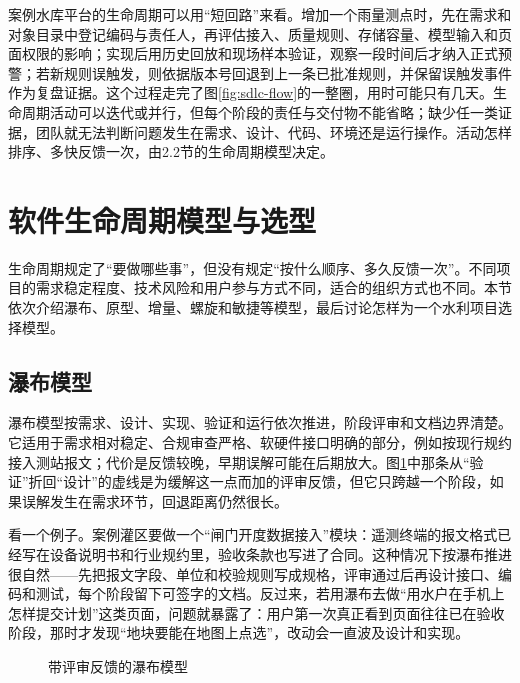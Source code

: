案例水库平台的生命周期可以用“短回路”来看。增加一个雨量测点时，先在需求和对象目录中登记编码与责任人，再评估接入、质量规则、存储容量、模型输入和页面权限的影响；实现后用历史回放和现场样本验证，观察一段时间后才纳入正式预警；若新规则误触发，则依据版本号回退到上一条已批准规则，并保留误触发事件作为复盘证据。这个过程走完了图\ref{fig:sdlc-flow}的一整圈，用时可能只有几天。生命周期活动可以迭代或并行，但每个阶段的责任与交付物不能省略；缺少任一类证据，团队就无法判断问题发生在需求、设计、代码、环境还是运行操作。活动怎样排序、多快反馈一次，由2.2节的生命周期模型决定。

\section{软件生命周期模型与选型}

生命周期规定了“要做哪些事”，但没有规定“按什么顺序、多久反馈一次”。不同项目的需求稳定程度、技术风险和用户参与方式不同，适合的组织方式也不同。本节依次介绍瀑布、原型、增量、螺旋和敏捷等模型，最后讨论怎样为一个水利项目选择模型。

\subsection{瀑布模型}

瀑布模型按需求、设计、实现、验证和运行依次推进，阶段评审和文档边界清楚。它适用于需求相对稳定、合规审查严格、软硬件接口明确的部分，例如按现行规约接入测站报文；代价是反馈较晚，早期误解可能在后期放大。图\ref{fig:waterfall-model}中那条从“验证”折回“设计”的虚线是为缓解这一点而加的评审反馈，但它只跨越一个阶段，如果误解发生在需求环节，回退距离仍然很长。

看一个例子。案例灌区要做一个“闸门开度数据接入”模块：遥测终端的报文格式已经写在设备说明书和行业规约里，验收条款也写进了合同。这种情况下按瀑布推进很自然——先把报文字段、单位和校验规则写成规格，评审通过后再设计接口、编码和测试，每个阶段留下可签字的文档。反过来，若用瀑布去做“用水户在手机上怎样提交计划”这类页面，问题就暴露了：用户第一次真正看到页面往往已在验收阶段，那时才发现“地块要能在地图上点选”，改动会一直波及设计和实现。

\begin{figure}[htbp]
\centering
{}
\caption{带评审反馈的瀑布模型}
\label{fig:waterfall-model}
\end{figure}


